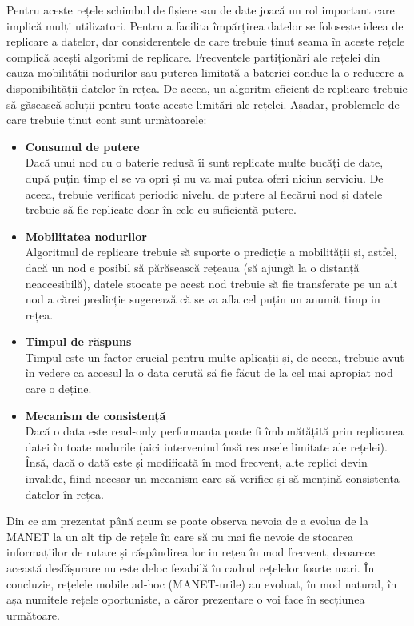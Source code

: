 \documentclass[12pt,a4paper]{report}
\begin{document}
Pentru aceste rețele schimbul de fișiere sau de date joacă un rol important care implică mulți utilizatori. Pentru a facilita împărțirea datelor se folosește ideea de replicare a datelor\cite{CDRA}, dar considerentele de care trebuie ținut seama în aceste rețele complică acești algoritmi de replicare. Frecventele partiționări ale rețelei din cauza mobilității nodurilor sau puterea limitată a bateriei conduc la o reducere a disponibilității datelor în rețea. De aceea, un algoritm eficient de replicare trebuie să găsească soluții pentru toate aceste limitări ale rețelei. Așadar, problemele de care trebuie ținut cont sunt următoarele:
\begin{itemize}
	\item\textbf{Consumul de putere} \hfill \\
	Dacă unui nod cu o baterie redusă îi sunt replicate multe bucăți de date, după puțin timp el se va opri și nu va mai putea oferi niciun serviciu. De aceea, trebuie verificat periodic nivelul de putere al fiecărui nod și datele trebuie să fie replicate doar în cele cu suficientă putere.
	\item\textbf{Mobilitatea nodurilor} \hfill \\
	Algoritmul de replicare trebuie să suporte o predicție a mobilității și, astfel, dacă un nod e posibil să părăsească rețeaua (să ajungă la o distanță neaccesibilă), datele stocate pe acest nod trebuie să fie transferate pe un alt nod a cărei predicție sugerează că se va afla cel puțin un anumit timp in rețea.
	\item\textbf{Timpul de răspuns} \hfill \\
	Timpul este un factor crucial pentru multe aplicații și, de aceea, trebuie avut în vedere ca accesul la o data cerută să fie făcut de la cel mai apropiat nod care o deține.
	\item\textbf{Mecanism de consistență} \hfill \\
	Dacă o data este read-only performanța poate fi îmbunătățită prin replicarea datei în toate nodurile (aici intervenind însă resursele limitate ale rețelei). Însă, dacă o dată este și modificată în mod frecvent, alte replici devin invalide, fiind necesar un mecanism care să verifice și să mențină consistența datelor în rețea.
\end{itemize}
Din ce am prezentat până acum se poate observa nevoia de a evolua de la MANET la un alt tip de rețele în care să nu mai fie nevoie de stocarea informațiilor de rutare și răspândirea lor in rețea în mod frecvent, deoarece această desfășurare nu este deloc fezabilă în cadrul rețelelor foarte mari. În concluzie, rețelele mobile ad-hoc (MANET-urile) au evoluat, în mod natural, în așa numitele rețele oportuniste, a căror prezentare o voi face în secțiunea următoare.
\end{document}

